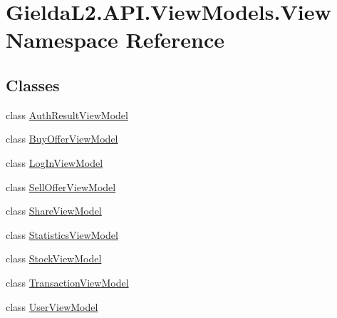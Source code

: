 \hypertarget{namespace_gielda_l2_1_1_a_p_i_1_1_view_models_1_1_view}{}\section{Gielda\+L2.\+A\+P\+I.\+View\+Models.\+View Namespace Reference}
\label{namespace_gielda_l2_1_1_a_p_i_1_1_view_models_1_1_view}
\subsection*{Classes}
\begin{DoxyCompactItemize}
\item 
class \mbox{\hyperlink{class_gielda_l2_1_1_a_p_i_1_1_view_models_1_1_view_1_1_auth_result_view_model}{Auth\+Result\+View\+Model}}
\item 
class \mbox{\hyperlink{class_gielda_l2_1_1_a_p_i_1_1_view_models_1_1_view_1_1_buy_offer_view_model}{Buy\+Offer\+View\+Model}}
\item 
class \mbox{\hyperlink{class_gielda_l2_1_1_a_p_i_1_1_view_models_1_1_view_1_1_log_in_view_model}{Log\+In\+View\+Model}}
\item 
class \mbox{\hyperlink{class_gielda_l2_1_1_a_p_i_1_1_view_models_1_1_view_1_1_sell_offer_view_model}{Sell\+Offer\+View\+Model}}
\item 
class \mbox{\hyperlink{class_gielda_l2_1_1_a_p_i_1_1_view_models_1_1_view_1_1_share_view_model}{Share\+View\+Model}}
\item 
class \mbox{\hyperlink{class_gielda_l2_1_1_a_p_i_1_1_view_models_1_1_view_1_1_statistics_view_model}{Statistics\+View\+Model}}
\item 
class \mbox{\hyperlink{class_gielda_l2_1_1_a_p_i_1_1_view_models_1_1_view_1_1_stock_view_model}{Stock\+View\+Model}}
\item 
class \mbox{\hyperlink{class_gielda_l2_1_1_a_p_i_1_1_view_models_1_1_view_1_1_transaction_view_model}{Transaction\+View\+Model}}
\item 
class \mbox{\hyperlink{class_gielda_l2_1_1_a_p_i_1_1_view_models_1_1_view_1_1_user_view_model}{User\+View\+Model}}
\end{DoxyCompactItemize}
